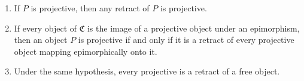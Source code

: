 \begin{enumerate}
\item[(i)] If $P$ is projective, then any retract of $P$ is projective.
\item[(ii)] If every object of $\mathfrak{C}$ is the image of a projective object under an epimorphism, then an object $P$ is projective if and only if it is a retract of every projective object mapping epimorphically onto it.
\item[(iii)] Under the same hypothesis, every projective is a retract of a free object.
\end{enumerate}
